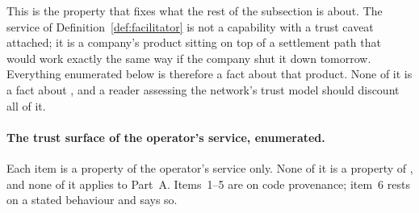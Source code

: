 This is the property that fixes what the rest of the subsection is about. The service of
Definition~\ref{def:facilitator} is not a \Flux capability with a trust caveat attached; it is a
company's product sitting on top of a settlement path that would work exactly the same way if the
company shut it down tomorrow. Everything enumerated below is therefore a fact about that product.
None of it is a fact about \Flux, and a reader assessing the network's trust model should discount
all of it.

\paragraph{The trust surface of the operator's service, enumerated.}
Each item is a property of the operator's service only. None of it is a property of \Flux, and none
of it applies to Part~A. Items~1--5 are \shipped on code provenance; item~6 rests on a stated
behaviour and says so.

